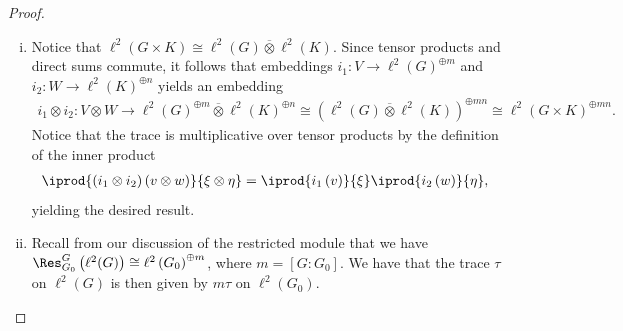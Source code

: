 \documentclass[10pt]{mypackage}
\begin{document}
\begin{proof}
\begin{enumerate}[(i)]
\begin{align*}
                                    &= \dim_{R(G)} \left( V' \right) + \dim_{R(G)} \left( V'' \right).
      \end{align*}
    \item Notice that $ \ell^2\left( G\times K \right) \cong \ell^2\left( G \right) \overline{\otimes} \ell^2\left( K \right) $. Since tensor products and direct sums commute, it follows that embeddings $i_1\colon V\rightarrow \ell^2\left( G \right)^{\oplus m}$ and $i_2\colon W\rightarrow \ell^2\left( K \right)^{\oplus n}$ yields an embedding
      \begin{align*}
        i_1\otimes i_2\colon V\otimes W \rightarrow \ell^2\left( G \right)^{\oplus m} \overline{\otimes} \ell^2\left( K \right)^{\oplus n} \cong \left( \ell^2\left( G \right) \overline{\otimes} \ell^2\left( K \right) \right)^{\oplus mn} \cong \ell^2\left( G\times K \right)^{\oplus mn}.
      \end{align*}
      Notice that the trace is multiplicative over tensor products by the definition of the inner product
      \begin{align*}
        \iprod{\left( i_1\otimes i_2 \right)\left( v\otimes w \right)}{\xi\otimes \eta} &= \iprod{i_1\left( v \right)}{\xi} \iprod{i_2\left( w \right)}{\eta},
      \end{align*}
      yielding the desired result.
    \item Recall from our discussion of the restricted module that we have $\Res_{G_0}^{G}\left( \ell^2(G) \right)\cong \ell^2\left( G_0 \right)^{\oplus m}$, where $m = \left[ G:G_0 \right]$. We have that the trace $\tau$ on $\ell^2(G)$ is then given by $ m\tau$ on $\ell^2\left( G_0 \right) $.
  \end{enumerate}
\end{proof}
\end{document}
